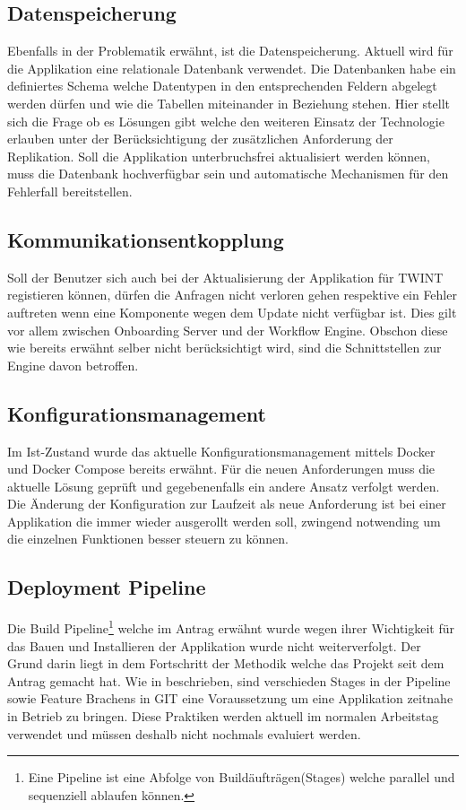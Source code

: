 \subsection{Datenspeicherung}

Ebenfalls in der Problematik erwähnt, ist die Datenspeicherung. Aktuell wird für die Applikation eine relationale Datenbank verwendet. Die Datenbanken habe ein definiertes Schema welche Datentypen in den entsprechenden Feldern abgelegt werden dürfen und wie die Tabellen miteinander in Beziehung stehen. Hier stellt sich die Frage ob es Lösungen gibt welche den weiteren Einsatz der Technologie erlauben unter der Berücksichtigung der zusätzlichen Anforderung der Replikation. Soll die Applikation unterbruchsfrei aktualisiert werden können, muss die Datenbank hochverfügbar sein und automatische Mechanismen für den Fehlerfall bereitstellen.

\subsection{Kommunikationsentkopplung}

Soll der Benutzer sich auch bei der Aktualisierung der Applikation für TWINT registieren können, dürfen die Anfragen nicht verloren gehen respektive ein Fehler auftreten wenn eine Komponente wegen dem Update nicht verfügbar ist. Dies gilt vor allem zwischen Onboarding Server und der Workflow Engine. Obschon diese wie bereits erwähnt selber nicht berücksichtigt wird, sind die Schnittstellen zur Engine davon betroffen.

\subsection{Konfigurationsmanagement}

Im Ist-Zustand wurde das aktuelle Konfigurationsmanagement mittels Docker und Docker Compose bereits erwähnt. Für die neuen Anforderungen muss die aktuelle Lösung geprüft und gegebenenfalls ein andere Ansatz verfolgt werden. Die Änderung der Konfiguration zur Laufzeit als neue Anforderung ist bei einer Applikation die immer wieder ausgerollt werden soll, zwingend notwending um die einzelnen Funktionen besser steuern zu können.

\subsection{Deployment Pipeline}

Die Build Pipeline\footnote{Eine Pipeline ist eine Abfolge von Buildäufträgen(Stages) welche parallel und sequenziell ablaufen können. } welche im Antrag erwähnt wurde wegen ihrer Wichtigkeit für das Bauen und Installieren der Applikation wurde nicht weiterverfolgt. Der Grund darin liegt in dem Fortschritt der Methodik welche das Projekt seit dem Antrag gemacht hat. Wie in\cite{atlassiancd} beschrieben, sind verschieden Stages in der Pipeline sowie Feature Brachens in GIT eine Voraussetzung um eine Applikation zeitnahe in Betrieb zu bringen. Diese Praktiken werden aktuell im normalen Arbeitstag verwendet und müssen deshalb nicht nochmals evaluiert werden.

